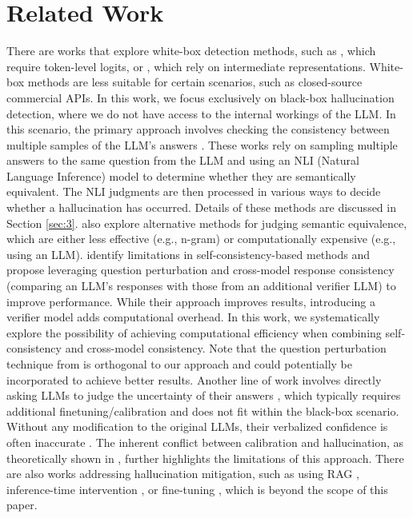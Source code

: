 \section{Related Work}
There are works that explore white-box detection methods, such as \cite{duan2024shifting,varshney2023stitch}, which require token-level logits, or \cite{yin2024characterizing,zou2023representation,agrawal2023language}, which rely on intermediate representations. White-box methods are less suitable for certain scenarios, such as closed-source commercial APIs. In this work, we focus exclusively on black-box hallucination detection, where we do not have access to the internal workings of the LLM. In this scenario, the primary approach involves checking the consistency between multiple samples of the LLM's answers \cite{manakul2023selfcheckgpt,farquhar2024detecting,kuhn2023semantic,lin2023generating,nikitin2024kernel}. These works rely on sampling multiple answers to the same question from the LLM and using an NLI (Natural Language Inference) model to determine whether they are semantically equivalent. The NLI judgments are then processed in various ways to decide whether a hallucination has occurred. Details of these methods are discussed in Section \ref{sec:3}. \citet{manakul2023selfcheckgpt,kuhn2023semantic} also explore alternative methods for judging semantic equivalence, which are either less effective (e.g., n-gram) or computationally expensive (e.g., using an LLM). \cite{SAC3_hallucination_detection_black_box_lms} identify limitations in self-consistency-based methods and propose leveraging question perturbation and cross-model response consistency (comparing an LLM's responses with those from an additional verifier LLM) to improve performance. While their approach improves results, introducing a verifier model adds computational overhead. In this work, we systematically explore the possibility of achieving computational efficiency when combining self-consistency and cross-model consistency. Note that the question perturbation technique from \cite{SAC3_hallucination_detection_black_box_lms} is orthogonal to our approach and could potentially be incorporated to achieve better results. Another line of work involves directly asking LLMs to judge the uncertainty of their answers \cite{mielke2022reducing,tian2023just,kadavath2022language,lin2022teaching}, which typically requires additional finetuning/calibration and does not fit within the black-box scenario. Without any modification to the original LLMs, their verbalized confidence is often inaccurate \cite{xiong2023can}. The inherent conflict between calibration and hallucination, as theoretically shown in \cite{calibrated_language_models_must_hallucinate}, further highlights the limitations of this approach. There are also works addressing hallucination mitigation, such as using RAG \cite{asai2023self,gao2022rarr}, inference-time intervention \cite{li2024inference}, or fine-tuning \cite{lee2022factuality,tian2023fine}, which is beyond the scope of this paper.